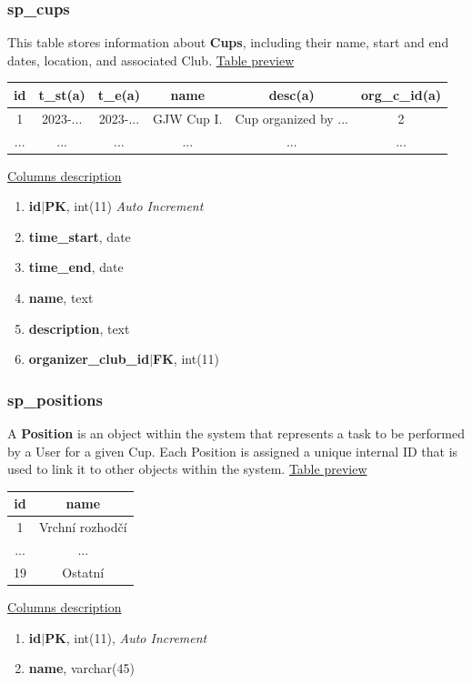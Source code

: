 \subsubsection*{sp\_cups}
This table stores information about \textbf{Cups}, including their name, start and end dates, location, and associated Club.
\newline
\underline{Table preview}
\begin{center}
 \begin{tabular}{||c c c c c c||} 
 \hline
 id & t\_st(a) & t\_e(a) & name & desc(a) & org\_c\_id(a) \\ [0.5ex] 
 \hline\hline
 1 & 2023-... & 2023-...& GJW Cup I. & Cup organized by ... & 2 \\ 
 \hline
 ... & ... & ... & ...&... & ...  \\ [0.5ex] 
 \hline
\end{tabular}
\end{center}
\underline{Columns description}
\begin{enumerate}
  \setlength\itemsep{0em}
  \item \textbf{id$|$PK}, int(11) \textit{Auto Increment}
  \item \textbf{time\_start}, date
  \item \textbf{time\_end}, date
  \item \textbf{name}, text
  \item \textbf{description}, text
  \item \textbf{organizer\_club\_id$|$FK}, int(11)
\end{enumerate}


\subsubsection*{sp\_positions}
A \textbf{Position} is an object within the system that represents a task to be performed by a User for a given Cup. Each Position is assigned a unique internal ID that is used to link it to other objects within the system.
\newline
\underline{Table preview}
\begin{center}
 \begin{tabular}{||c c||} 
 \hline
 id & name  \\ [0.5ex] 
 \hline\hline
 1 & Vrchní rozhodčí \\ 
 \hline
 ... & ...  \\ [0.5ex]
\hline
 19 & Ostatní  \\
 \hline
\end{tabular}
\end{center}
\underline{Columns description}
\begin{enumerate}
  \setlength\itemsep{0em}
  \item \textbf{id$|$PK}, int(11), \textit{Auto Increment}
  \item \textbf{name}, varchar(45)
\end{enumerate}

